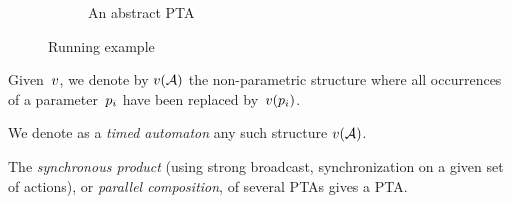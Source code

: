 \begin{tikzborder}{\cite{Gargantini16:validation}}
\begin{tikzborder}{\cite{gargantini_combinatorial_2017}}
\begin{tikzborder}{\cite{garn2019}}
\begin{tikzborder}{\cite{arcaini2019achieving}}
\begin{tikzborder}{\cite{arcaini2019varivolution}}
\begin{figure}[!htb]
\begin{subfigure}[b]{0.49\textwidth}
\begin{tikzpicture}[scale=1, xscale=1.1, yscale=1.1, auto, ->, >=stealth']
		\end{tikzpicture}
		\caption{An abstract PTA}
		\label{figure:example-PTA}
		
	\end{subfigure}
	\caption{Running example}
	\label{figure:example}
\end{figure}

\begin{tikzborder}{}
Given~$\pval$, we denote by $\valuate{\A}{\pval}$ the non-parametric structure where all occurrences of a parameter~$\param_i$ have been replaced by~$\pval(\param_i)$.

We denote as a \emph{timed automaton} any such structure $\valuate{\A}{\pval}$.

The \emph{synchronous product} (using strong broadcast, \ie{} synchronization on a given set of actions), or \emph{parallel composition}, of several PTAs gives a PTA. %


\end{tikzborder}
\end{tikzborder}
\end{tikzborder}
\end{tikzborder}
\end{tikzborder}
\end{tikzborder}
